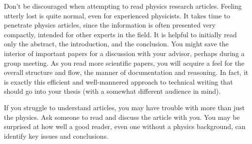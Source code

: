 Don't be discouraged when attempting to read physics research
articles. Feeling utterly lost is quite normal, even for experienced
physicists. It takes time to penetrate physics articles, since the
information is often presented very compactly, intended for other
experts in the field. It is helpful to initially read only the
abstract, the introduction, and the conclusion. You might save the
interior of important papers for a discussion with your advisor,
perhaps during a group meeting. As you read more scientific papers,
you will acquire a feel for the overall structure and flow, the
manner of documentation and reasoning. In fact, it is exactly this
efficient and well-mannered approach to technical writing that
should go into your thesis (with a somewhat different audience in
mind).

If you struggle to understand articles, you may have trouble
with more than just the physics. Ask someone to read and discuss the article with you.
You may be surprised at how well a good reader, even
one without a physics background, can identify key issues and conclusions.

